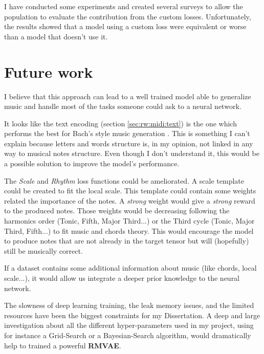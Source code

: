 \documentclass[12pt]{report}
\begin{document}
I have conducted some experiments and created several surveys to allow the population to evaluate the contribution from the custom losses.
Unfortunately, the results showed that a model using a custom loss were equivalent or worse than a model that doesn't use it.


\section*{Future work}

I believe that this approach can lead to a well trained model able to generalize music and handle most of the tasks someone could ask to a neural network.

It looks like the text encoding (section \ref{sec:rw:midi:text}) is the one which performs the best for Bach's style music generation \cite{hadjeres_deepbach:_2016, liang_automatic_2017}.
This is something I can't explain because letters and words structure is, in my opinion, not linked in any way to musical notes structure.
Even though I don't understand it, this would be a possible solution to improve the model's performance.

The \textit{Scale} and \textit{Rhythm} loss functions could be ameliorated.
A scale template could be created to fit the local scale.
This template could contain some weights related the importance of the notes.
A \textit{strong} weight would give a \textit{strong} reward to the produced notes.
Those weights would be decreasing following the harmonics order (Tonic, Fifth, Major Third...) or the Third cycle (Tonic, Major Third, Fifth...) to fit music and chords theory.
This would encourage the model to produce notes that are not already in the target tensor but will (hopefully) still be musically correct.

If a dataset contains some additional information about music (like chords, local scale...), it would allow us integrate a deeper prior knowledge to the neural network.

The slowness of deep learning training, the leak memory issues, and the limited resources have been the biggest constraints for my Dissertation.
A deep and large investigation about all the different hyper-parameters used in my project, using for instance a Grid-Search or a Bayesian-Search algorithm, would dramatically help to trained a powerful \textbf{RMVAE}.
\end{document}
